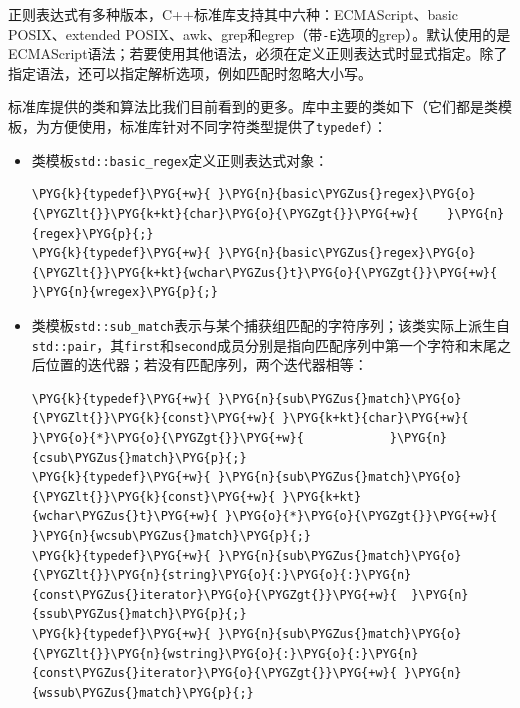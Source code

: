 正则表达式有多种版本，C++标准库支持其中六种：ECMAScript、basic POSIX、extended POSIX、awk、grep和egrep（带\texttt{-\allowbreak{}E}选项的grep）。默认使用的是ECMAScript语法；若要使用其他语法，必须在定义正则表达式时显式指定。除了指定语法，还可以指定解析选项，例如匹配时忽略大小写。



标准库提供的类和算法比我们目前看到的更多。库中主要的类如下（它们都是类模板，为方便使用，标准库针对不同字符类型提供了\texttt{typedef}）：



\begin{itemize}
\item 类模板\texttt{std::\allowbreak{}basic\_\allowbreak{}regex}定义正则表达式对象：



\begin{codeblockbg}
\begin{Verbatim}[commandchars=\\\{\},breaklines=true,breakanywhere=true,fontsize=\codefont,xleftmargin=17bp]
\PYG{k}{typedef}\PYG{+w}{ }\PYG{n}{basic\PYGZus{}regex}\PYG{o}{\PYGZlt{}}\PYG{k+kt}{char}\PYG{o}{\PYGZgt{}}\PYG{+w}{    }\PYG{n}{regex}\PYG{p}{;}
\PYG{k}{typedef}\PYG{+w}{ }\PYG{n}{basic\PYGZus{}regex}\PYG{o}{\PYGZlt{}}\PYG{k+kt}{wchar\PYGZus{}t}\PYG{o}{\PYGZgt{}}\PYG{+w}{ }\PYG{n}{wregex}\PYG{p}{;}
\end{Verbatim}
\end{codeblockbg}



\item 类模板\texttt{std::\allowbreak{}sub\_\allowbreak{}match}表示与某个捕获组匹配的字符序列；该类实际上派生自\texttt{std::\allowbreak{}pair}，其\texttt{first}和\texttt{second}成员分别是指向匹配序列中第一个字符和末尾之后位置的迭代器；若没有匹配序列，两个迭代器相等：



\begin{codeblockbg}
\begin{Verbatim}[commandchars=\\\{\},breaklines=true,breakanywhere=true,fontsize=\codefont,xleftmargin=17bp]
\PYG{k}{typedef}\PYG{+w}{ }\PYG{n}{sub\PYGZus{}match}\PYG{o}{\PYGZlt{}}\PYG{k}{const}\PYG{+w}{ }\PYG{k+kt}{char}\PYG{+w}{ }\PYG{o}{*}\PYG{o}{\PYGZgt{}}\PYG{+w}{            }\PYG{n}{csub\PYGZus{}match}\PYG{p}{;}
\PYG{k}{typedef}\PYG{+w}{ }\PYG{n}{sub\PYGZus{}match}\PYG{o}{\PYGZlt{}}\PYG{k}{const}\PYG{+w}{ }\PYG{k+kt}{wchar\PYGZus{}t}\PYG{+w}{ }\PYG{o}{*}\PYG{o}{\PYGZgt{}}\PYG{+w}{         }\PYG{n}{wcsub\PYGZus{}match}\PYG{p}{;}
\PYG{k}{typedef}\PYG{+w}{ }\PYG{n}{sub\PYGZus{}match}\PYG{o}{\PYGZlt{}}\PYG{n}{string}\PYG{o}{:}\PYG{o}{:}\PYG{n}{const\PYGZus{}iterator}\PYG{o}{\PYGZgt{}}\PYG{+w}{  }\PYG{n}{ssub\PYGZus{}match}\PYG{p}{;}
\PYG{k}{typedef}\PYG{+w}{ }\PYG{n}{sub\PYGZus{}match}\PYG{o}{\PYGZlt{}}\PYG{n}{wstring}\PYG{o}{:}\PYG{o}{:}\PYG{n}{const\PYGZus{}iterator}\PYG{o}{\PYGZgt{}}\PYG{+w}{ }\PYG{n}{wssub\PYGZus{}match}\PYG{p}{;}
\end{Verbatim}
\end{codeblockbg}



\end{itemize}

